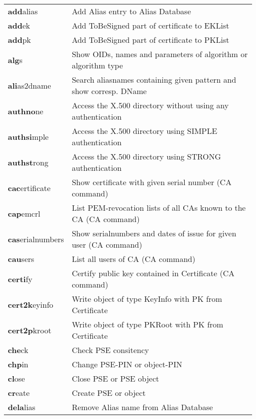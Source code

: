 \begin{tabular}{ll}
{\bf add}alias     & Add Alias entry to Alias Database           		       \\
{\bf add}ek        & Add ToBeSigned part of certificate to EKList    		       \\
{\bf add}pk        & Add ToBeSigned part of certificate to PKList    		       \\
{\bf alg}s         & Show OIDs, names and parameters of algorithm or algorithm type    \\
{\bf ali}as2dname  & Search aliasnames containing given pattern and show corresp. DName\\
{\bf authno}ne     & Access the X.500 directory without using any authentication       \\
{\bf authsi}mple   & Access the X.500 directory using SIMPLE authentication            \\
{\bf authst}rong   & Access the X.500 directory using STRONG authentication            \\
{\bf cac}ertificate & Show certificate with given serial number (CA command)           \\
{\bf cap}emcrl     & List PEM-revocation lists of all CAs known to the CA (CA command) \\
{\bf cas}erialnumbers & Show serialnumbers and dates of issue for given user (CA command) \\
{\bf cau}sers      & List all users of CA (CA command)                                 \\
{\bf certi}fy      & Certify public key contained in Certificate (CA command)          \\
{\bf cert2k}eyinfo & Write object of type KeyInfo with PK from Certificate             \\
{\bf cert2p}kroot  & Write object of type PKRoot with PK from Certificate              \\
{\bf che}ck        & Check PSE consitency                                              \\
{\bf chp}in        & Change PSE-PIN or object-PIN                                      \\
{\bf cl}ose        & Close PSE or PSE object                                           \\
{\bf cr}eate       & Create PSE or object                                              \\
{\bf dela}lias     & Remove Alias name from Alias Database               	       \\

\end{tabular}
